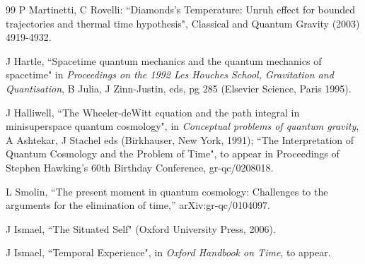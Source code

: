 \documentclass[10pt,nofootinbib]{revtex4}
\begin{document}
\begin{thebibliography}{99}
 P Martinetti, C Rovelli:
``Diamonds's Temperature: Unruh effect
for bounded trajectories and thermal time hypothesis", 
Classical and Quantum Gravity (2003) 4919-4932. 


 J Hartle, ``Spacetime quantum mechanics and the
quantum mechanics of spacetime" in {\em Proceedings on the 1992 Les
Houches School, Gravitation and Quantisation}, B Julia, J Zinn-Justin,
eds, pg 285 (Elsevier Science, Paris 1995).

 J Halliwell, ``The Wheeler-deWitt equation and the
path integral in minisuperspace quantum cosmology", in {\em Conceptual
problems of quantum gravity}, A Ashtekar, J Stachel eds (Birkhauser,
New York, 1991); ``The Interpretation of Quantum Cosmology and the
Problem of Time", to appear in Proceedings of Stephen Hawking's 60th
Birthday Conference, gr-qc/0208018.

  L Smolin,
  ``The present moment in quantum cosmology: Challenges to the arguments  for
  the elimination of time,''  arXiv:gr-qc/0104097.

J Ismael, ``The Situated Self" (Oxford University Press, 2006).

J Ismael, ``Temporal Experience", in \emph{Oxford Handbook on Time},
to appear. 

    
\end{thebibliography}
\end{document}
